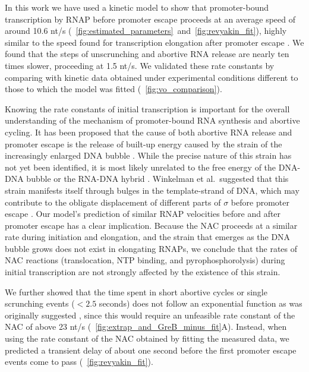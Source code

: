 %

In this work we have used a kinetic model to show that promoter-bound
transcription by RNAP before promoter escape proceeds at an average speed of
around 10.6 nt/s
(\FIGS~\ref{fig:estimated_parameters}~and~\ref{fig:revyakin_fit}), highly
similar to the speed found for transcription elongation after promoter escape
\cite{revyakin_abortive_2006}. We found that the steps of unscrunching and
abortive RNA release are nearly ten times slower, proceeding at 1.5 nt/s. We
validated these rate constants by comparing with kinetic data obtained under
experimental conditions different to those to which the model was fitted
(\FIG~\ref{fig:vo_comparison}).

Knowing the rate constants of initial transcription is important for the
overall understanding of the mechanism of promoter-bound RNA synthesis and
abortive cycling. It has been proposed that the cause of both abortive RNA
release and promoter escape is the release of built-up energy caused by the
strain of the increasingly enlarged DNA bubble \cite{straney_stressed_1987,
hsu_promoter_2002, revyakin_abortive_2006}. While the precise nature of this
strain has not yet been identified, it is most likely unrelated to the free
energy of the DNA-DNA bubble or the RNA-DNA hybrid \cite{hsu_initial_2006,
skancke_sequence-dependent_2015}. Winkelman et al.\ suggested that this strain
manifests itself through bulges in the template-strand of DNA, which may
contribute to the obligate displacement of different parts of $\sigma$ before
promoter escape \cite{winkelman_crosslink_2015}. Our model's prediction of
similar RNAP velocities before and after promoter escape has a clear
implication. Because the NAC proceeds at a similar rate during initiation and
elongation, and the strain that emerges as the DNA bubble grows does not exist
in elongating RNAPs, we conclude that the rates of NAC reactions
(translocation, NTP binding, and pyrophosphorolysis) during initial
transcription are not strongly affected by the existence of this strain.

We further showed that the time spent in short abortive cycles or single
scrunching events ($< 2.5$ seconds) does not follow an exponential function
as was originally suggested \cite{revyakin_abortive_2006}, since this would
require an unfeasible rate constant of the NAC of above 23 nt/s
(\FIG~\ref{fig:extrap_and_GreB_minus_fit}A). Instead, when using the rate
constant of the NAC obtained by fitting the measured data, we predicted a
transient delay of about one second before the first promoter escape events
come to pass (\FIG~\ref{fig:revyakin_fit}).

